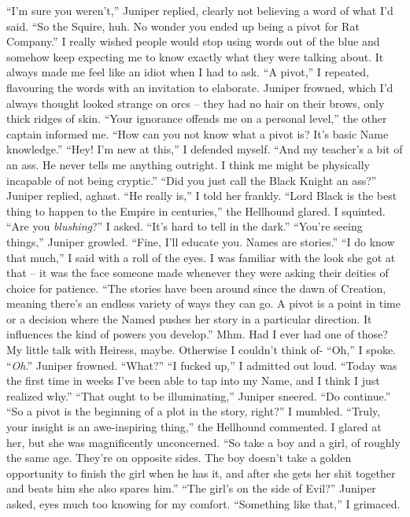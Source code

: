 \documentclass[12pt, openany]{book}
\begin{document}
“I’m sure you weren’t,” Juniper replied, clearly not believing a word of what I’d said. “So the Squire, huh. No wonder you ended up being a pivot for Rat Company.”
I really wished people would stop using words out of the blue and somehow keep expecting me to know exactly what they were talking about. It always made me feel like an idiot when I had to ask.
“A pivot,” I repeated, flavouring the words with an invitation to elaborate.
Juniper frowned, which I’d always thought looked strange on orcs – they had no hair on their brows, only thick ridges of skin.
“Your ignorance offends me on a personal level,” the other captain informed me. “How can you not know what a pivot is? It’s basic Name knowledge.”
“Hey! I’m new at this,” I defended myself. “And my teacher’s a bit of an ass. He never tells me anything outright. I think me might be physically incapable of not being cryptic.”
“Did you just call the Black Knight an ass?” Juniper replied, aghast.
“He really is,” I told her frankly.
“Lord Black is the best thing to happen to the Empire in centuries,” the Hellhound glared.
I squinted.
“Are you \textit{blushing}?” I asked. “It’s hard to tell in the dark.”
“You’re seeing things,” Juniper growled. “Fine, I’ll educate you. Names are stories.”
“I do know that much,” I said with a roll of the eyes.
I was familiar with the look she got at that – it was the face someone made whenever they were asking their deities of choice for patience.
“The stories have been around since the dawn of Creation, meaning there’s an endless variety of ways they can go. A pivot is a point in time or a decision where the Named pushes her story in a particular direction. It influences the kind of powers you develop.”
Mhm. Had I ever had one of those? My little talk with Heiress, maybe. Otherwise I couldn’t think of-
“Oh,” I spoke. “\textit{Oh}.”
Juniper frowned.
“What?”
“I fucked up,” I admitted out loud. “Today was the first time in weeks I’ve been able to tap into my Name, and I think I just realized why.”
“That ought to be illuminating,” Juniper sneered. “Do continue.”
“So a pivot is the beginning of a plot in the story, right?” I mumbled.
“Truly, your insight is an awe-inspiring thing,” the Hellhound commented.
I glared at her, but she was magnificently unconcerned.
“So take a boy and a girl, of roughly the same age. They’re on opposite sides. The boy doesn’t take a golden opportunity to finish the girl when he has it, and after she gets her shit together and beats him she also spares him.”
“The girl’s on the side of Evil?” Juniper asked, eyes much too knowing for my comfort.
“Something like that,” I grimaced.
\end{document}
